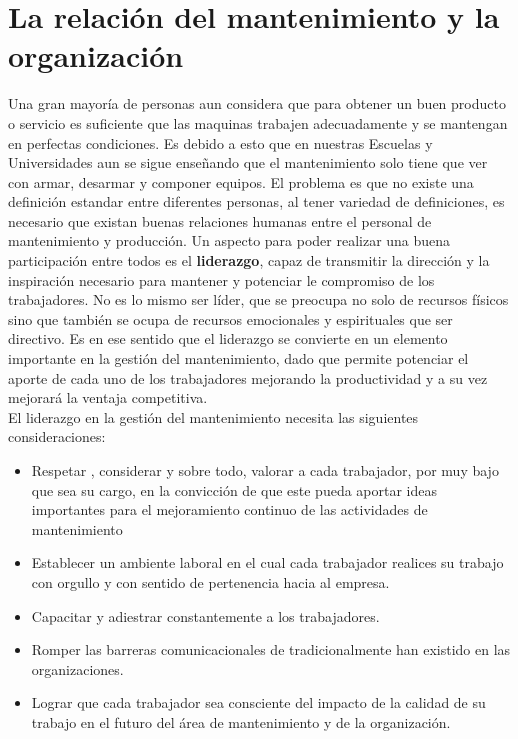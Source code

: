 \documentclass[
	12pt, %
	fleqn, %
	a4paper, %
	oneside, %
]{LegrandOrangeBook}
\begin{document}
\section{La relación del mantenimiento y la organización}
Una gran mayoría de personas aun considera que para
obtener un buen producto o servicio es suficiente que las maquinas trabajen adecuadamente y se mantengan en
perfectas condiciones. Es debido a esto que en nuestras Escuelas y Universidades aun se sigue
enseñando que el mantenimiento solo tiene que ver con
armar, desarmar y componer equipos. El problema es que no existe una definición estandar entre diferentes personas, al tener variedad de definiciones, es necesario que existan buenas relaciones humanas entre el personal de mantenimiento y producción. Un aspecto para poder realizar una buena participación entre todos es el \textbf{liderazgo}, capaz de transmitir la dirección y la inspiración necesario para mantener y potenciar le compromiso de los trabajadores. No es lo mismo ser líder, que se preocupa no solo de recursos físicos sino que también se ocupa de recursos emocionales y espirituales que ser directivo. Es en ese sentido que el liderazgo se convierte en un elemento importante en la gestión del mantenimiento, dado que permite potenciar el aporte de cada uno de los trabajadores mejorando la productividad y a su vez mejorará la ventaja competitiva.\\
El liderazgo en la gestión del mantenimiento necesita las siguientes consideraciones:
\begin{itemize}
\item Respetar , considerar y sobre todo, valorar a cada trabajador, por muy bajo que sea su cargo, en la convicción de que este pueda aportar ideas importantes para el mejoramiento continuo de las actividades de mantenimiento
\item Establecer un ambiente laboral en el cual cada trabajador realices su trabajo con orgullo y con sentido de pertenencia hacia al empresa. 
\item Capacitar y adiestrar constantemente a los trabajadores.
\item Romper las barreras comunicacionales de tradicionalmente han existido en las organizaciones.
\item Lograr que cada trabajador sea consciente del impacto de la calidad de su trabajo en el futuro del área de mantenimiento y de la organización.
\end{itemize}
\end{document}
